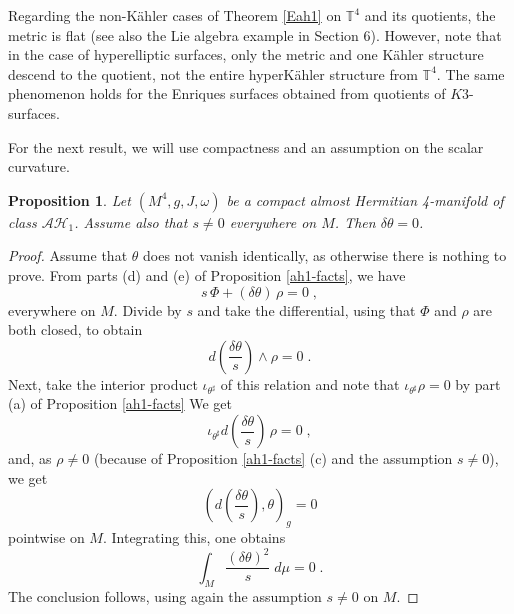 \documentclass{amsart}
\newtheorem{prop}[theorem]{Proposition}
\begin{document}
\vspace{0.2cm}
\noindent Regarding the non-K\"ahler cases of Theorem \ref{Eah1} on $\mathbb{T}^4$ and its quotients, the metric is flat (see also the Lie algebra example in Section 6). However, note that in the case of hyperelliptic surfaces, only the metric and one K\"ahler structure descend to the quotient, not the entire hyperK\"ahler structure from $\mathbb{T}^4$. The same phenomenon holds for the Enriques surfaces obtained from quotients of $K3$-surfaces.

\vspace{0.2cm}
\noindent
For the next result, we will use compactness and an assumption on the scalar curvature.

\begin{prop} \label{ah1-Gaud}
    Let $(M^4, g, J, \omega)$ be a compact almost Hermitian 4-manifold of class $\mathcal{AH}_1$. Assume also that $s\neq 0$ everywhere on $M$. Then $\delta \theta = 0$. 
\end{prop}

\begin{proof}
   Assume that $\theta$ does not vanish identically, as otherwise there is nothing to prove. From parts (d) and (e) of Proposition \ref{ah1-facts}, we have
$$ s \, \Phi + (\delta \theta) \, \rho = 0 \; ,$$    
everywhere on $M$. Divide by $s$ and take the differential, using that $\Phi$ and $\rho$ are both closed, to obtain
%
%
%
%
$$ d \left( \frac{\delta \theta}{s} \right) \wedge \rho = 0\; . $$
Next, take the interior product $\iota_{\theta^{\sharp}}$ of this relation and note that $\iota_{\theta^{\sharp}} \rho  =0$ by part (a) of Proposition \ref{ah1-facts}
We get 
$$ \iota_{\theta^{\sharp}} d \left( \frac{\delta \theta}{s} \right) \,\rho = 0\; ,$$
and, as $\rho \neq 0$ (because of Proposition \ref{ah1-facts} (c) and the assumption $s \neq 0$), we get 
$$ \left( d \left( \frac{\delta \theta}{s} \right), \theta \right)_g = 0 $$
pointwise on $M$. Integrating this, one obtains
$$\int_M \frac{(\delta \theta)^2}{s} \; d\mu = 0 \; . $$
The conclusion follows, using again the assumption $s \neq 0$ on $M$.
\end{proof}
\end{document}
